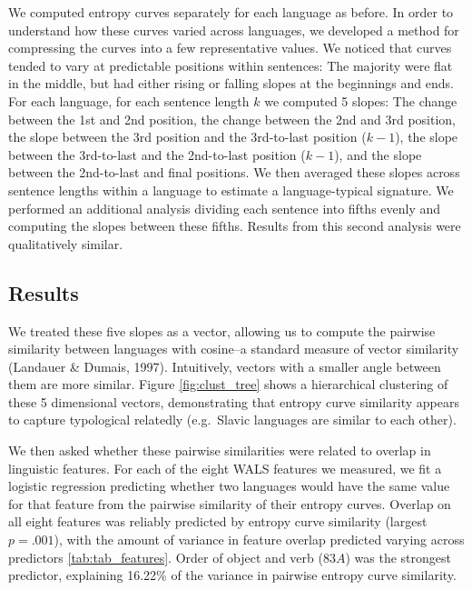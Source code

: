 \documentclass[10pt, letterpaper]{article}
\begin{document}
We computed entropy curves separately for each language as before. In
order to understand how these curves varied across languages, we
developed a method for compressing the curves into a few representative
values. We noticed that curves tended to vary at predictable positions
within sentences: The majority were flat in the middle, but had either
rising or falling slopes at the beginnings and ends. For each language,
for each sentence length \(k\) we computed 5 slopes: The change between
the 1st and 2nd position, the change between the 2nd and 3rd position,
the slope between the 3rd position and the 3rd-to-last position
(\(k-1\)), the slope between the 3rd-to-last and the 2nd-to-last
position (\(k-1\)), and the slope between the 2nd-to-last and final
positions. We then averaged these slopes across sentence lengths within
a language to estimate a language-typical signature. We performed an
additional analysis dividing each sentence into fifths evenly and
computing the slopes between these fifths. Results from this second
analysis were qualitatively similar.

\subsection{Results}\label{results-2}

We treated these five slopes as a vector, allowing us to compute the
pairwise similarity between languages with cosine--a standard measure of
vector similarity (Landauer \& Dumais, 1997). Intuitively, vectors with
a smaller angle between them are more similar. Figure
\ref{fig:clust_tree} shows a hierarchical clustering of these 5
dimensional vectors, demonstrating that entropy curve similarity appears
to capture typological relatedly (e.g.~Slavic languages are similar to
each other).

We then asked whether these pairwise similarities were related to
overlap in linguistic features. For each of the eight WALS features we
measured, we fit a logistic regression predicting whether two languages
would have the same value for that feature from the pairwise similarity
of their entropy curves. Overlap on all eight features was reliably
predicted by entropy curve similarity (largest \(p = .001\)), with the
amount of variance in feature overlap predicted varying across
predictors \ref{tab:tab_features}. Order of object and verb (\(83A\))
was the strongest predictor, explaining 16.22\% of the variance in
pairwise entropy curve similarity.
\end{document}
